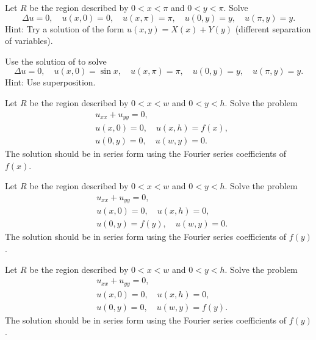 \documentclass[12pt]{book}
\begin{document}
\begin{exercise} \label{dirich:diffsepexr}
Let $R$ be the region described by $0 < x < \pi$ and $0 < y < \pi$.
Solve
\begin{equation*}
\Delta u = 0,
\quad u(x,0) = 0,
\quad u(x,\pi) = \pi,
\quad u(0,y) = y,
\quad u(\pi,y) = y .
\end{equation*}
Hint: Try a solution of the form $u(x,y) = X(x) + Y(y)$ (different separation
of variables).
\end{exercise}

\begin{exercise}
Use the solution of  to solve
\begin{equation*}
\Delta u = 0,
\quad u(x,0) = \sin x,
\quad u(x,\pi) = \pi,
\quad u(0,y) = y,
\quad u(\pi,y) = y .
\end{equation*}
Hint: Use superposition.
\end{exercise}

\begin{exercise}
Let $R$ be the region described by $0 < x < w$ and $0 < y < h$.
Solve the problem
\begin{align*}
& u_{xx} + u_{yy} = 0, \\
& u(x,0) = 0, \quad u(x,h) = f(x), \\
& u(0,y) = 0, \quad u(w,y) = 0.
\end{align*}
The solution should be in series form using the Fourier series coefficients
of $f(x)$.
\end{exercise}

\begin{exercise}
Let $R$ be the region described by $0 < x < w$ and $0 < y < h$.
Solve the problem
\begin{align*}
& u_{xx} + u_{yy} = 0, \\
& u(x,0) = 0, \quad u(x,h) = 0, \\
& u(0,y) = f(y), \quad u(w,y) = 0.
\end{align*}
The solution should be in series form using the Fourier series coefficients
of $f(y)$.
\end{exercise}

\begin{exercise}
Let $R$ be the region described by $0 < x < w$ and $0 < y < h$.
Solve the problem
\begin{align*}
& u_{xx} + u_{yy} = 0, \\
& u(x,0) = 0, \quad u(x,h) = 0, \\
& u(0,y) = 0, \quad u(w,y) = f(y).
\end{align*}
The solution should be in series form using the Fourier series coefficients
of $f(y)$.
\end{exercise}
\end{document}

